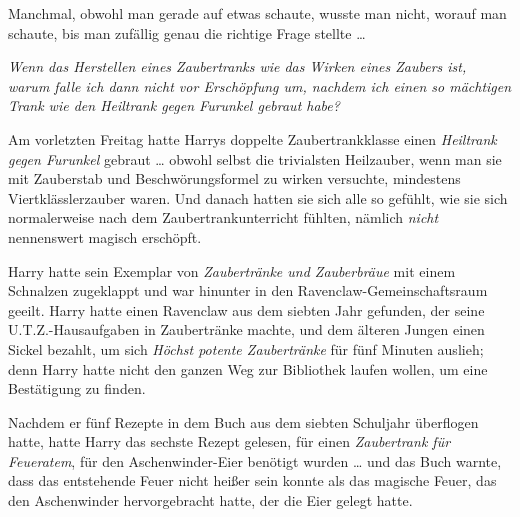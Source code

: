 Manchmal, obwohl man gerade auf etwas schaute, wusste man nicht, worauf man schaute, bis man zufällig genau die richtige Frage stellte …

\emph{Wenn das Herstellen eines Zaubertranks wie das Wirken eines Zaubers ist, warum falle ich dann nicht vor Erschöpfung um, nachdem ich einen so mächtigen Trank wie den Heiltrank gegen Furunkel gebraut habe?}

Am vorletzten Freitag hatte Harrys doppelte Zaubertrankklasse einen \emph{Heiltrank gegen Furunkel} gebraut … obwohl selbst die trivialsten Heilzauber, wenn man sie mit Zauberstab und Beschwörungsformel zu wirken versuchte, mindestens Viertklässlerzauber waren. Und danach hatten sie sich alle so gefühlt, wie sie sich normalerweise nach dem Zaubertrankunterricht fühlten, nämlich \emph{nicht} nennenswert magisch erschöpft.

Harry hatte sein Exemplar von \emph{Zaubertränke und Zauberbräue} mit einem Schnalzen zugeklappt und war hinunter in den Ravenclaw-Gemeinschaftsraum geeilt. Harry hatte einen Ravenclaw aus dem siebten Jahr gefunden, der seine U.T.Z.-Hausaufgaben in Zaubertränke machte, und dem älteren Jungen einen Sickel bezahlt, um sich \emph{Höchst potente Zaubertränke} für fünf Minuten auslieh; denn Harry hatte nicht den ganzen Weg zur Bibliothek laufen wollen, um eine Bestätigung zu finden.

Nachdem er fünf Rezepte in dem Buch aus dem siebten Schuljahr überflogen hatte, hatte Harry das sechste Rezept gelesen, für einen \emph{Zaubertrank für Feueratem}, für den Aschenwinder-Eier benötigt wurden … und das Buch warnte, dass das entstehende Feuer nicht heißer sein konnte als das magische Feuer, das den Aschenwinder hervorgebracht hatte, der die Eier gelegt hatte.


